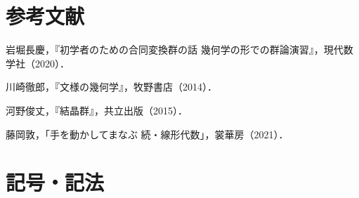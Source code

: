 \documentclass[11pt, uplatex, dvipdfmx, titlepage]{jsarticle}
\theoremstyle{definition}
\begin{document}
\section*{参考文献}
\begin{enumerate}[{[}1{]}]
 岩堀長慶，『初学者のための合同変換群の話 幾何学の形での群論演習』，現代数学社（2020）．

 川崎徹郎，『文様の幾何学』，牧野書店（2014）．

 河野俊丈，『結晶群』，共立出版（2015）．

 藤岡敦，「手を動かしてまなぶ 続・線形代数」，裳華房（2021）．
\end{enumerate}

 
 \newpage

 \section*{記号・記法}
 
\end{document}
